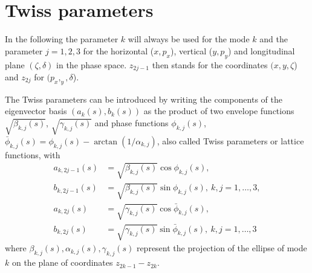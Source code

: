 \section{Twiss parameters}
\label{opt:sec:4}
In the following the parameter $k$ will always be used for the mode $k$ and the parameter
$j=1,2,3$ for the horizontal ($x,p_x$), vertical ($y,p_y$) and longitudinal plane
$(\zeta,\delta)$ in the phase space. $z_{2j-1}$ then stands for the coordinates $(x,y,\zeta$)
and $z_{2j}$ for $(p_x,_y,\delta$).

The Twiss parameters can be introduced by writing the components of the eigenvector basis
$(a_k(s),b_k(s))$ as the product of two envelope functions $\sqrt{\beta_{k,j}(s)}$,
$\sqrt{\gamma_{k,j}(s)}$ and phase functions $\phi_{k,j}(s)$, $\bar\phi_{k,j}(s) = \phi_{k,j}(s) - \arctan(1/\alpha_{k,j})$,
also called Twiss parameters or lattice functions, with
\begin{align}
a_{k,2j-1}(s)&=\sqrt{\beta_{k,j}(s)}\cos{\phi_{k,j}(s)},\nonumber\\ b_{k,2j-1}(s)&=\sqrt{\beta_{k,j}(s)}\sin{\phi_{k,j}(s)}, \ k,j=1,\ldots,3, \label{opt:eqn:4:1}\\
a_{k,2j}(s)&=\sqrt{\gamma_{k,j}(s)}\cos{\bar\phi_{k,j}(s)}, \nonumber\\
b_{k,2j}(s)&=\sqrt{\gamma_{k,j}(s)}\sin{\bar\phi_{k,j}(s)}, \ k,j=1,\ldots,3 \label{opt:eqn:4:2}
\end{align}
where $\beta_{k,j}(s), \alpha_{k,j}(s), \gamma_{k,j}(s)$ represent the projection of the ellipse of mode $k$ on the plane of coordinates $z_{2k-1}-z_{2k}$. 

